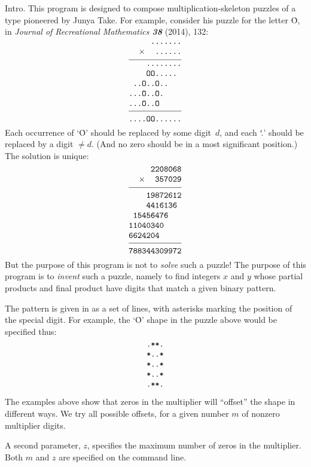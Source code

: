 
\datethis


Intro. This program is designed to compose multiplication-skeleton
puzzles
of a type pioneered by Junya Take. For example, consider his puzzle for
the letter \.O, in {\sl Journal of Recreational Mathematics\/ \bf38} (2014),
132:
$$\vcenter{\halign{\hfil\tt#\cr
.......\cr
$\times$\hfil......\cr
\noalign{\medskip\hrule\medskip}
........\cr
OO.....\ \cr
..O..O..\ \ \ \cr
...O..O.\ \ \ \ \cr
...O..O\ \ \ \ \ \cr
\noalign{\medskip\hrule\medskip}
....OO......\cr}}$$
Each occurrence of `\.O' should be replaced by some digit~$d$, and
each `\..' should be replaced by a digit $\ne d$. (And no zero should be
in a most significant position.) The solution is unique:
$$\vcenter{\halign{\hfil\tt#\cr
2208068\cr
$\times$\hfil357029\cr
\noalign{\medskip\hrule\medskip}
19872612\cr
4416136\ \cr
15456476\ \ \ \cr
11040340\ \ \ \ \cr
6624204\ \ \ \ \ \cr
\noalign{\medskip\hrule\medskip}
788344309972\cr}}$$
But the purpose of this program is not to {\it solve\/} such a puzzle!
The purpose of this program is to {\it invent\/} such a puzzle, namely to
find integers $x$ and $y$ whose partial
products and final product have digits that match a given binary pattern.

The pattern is given in  as a set of lines, with asterisks
marking
the position of the special digit. For example, the `\.O' shape in the
puzzle above would be specified thus:
$$\vcenter{\halign{\hfill\tt#\cr
.**.\cr
*..*\cr
*..*\cr
*..*\cr
.**.\cr}}$$

\fi

The examples above show that zeros in the multiplier will ``offset''
the shape in different ways. We try all possible offsets, for a
given number $m$ of nonzero multiplier digits.

A second parameter, $z$, specifies the maximum number of zeros
in the multiplier. Both $m$ and $z$ are specified on the command line.

